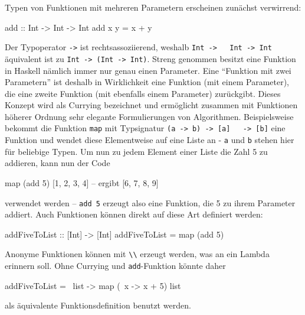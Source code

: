 \documentclass[12pt, a4paper, bibgerm]{scrbook}
\newenvironment{DIFnomarkup}{}{}
\newcommand\icode[1]{\lstinline?#1?}
\begin{document}
Typen von Funktionen mit mehreren Parametern erscheinen
zunächst verwirrend:
\begin{DIFnomarkup}\begin{code}
add :: Int -> Int -> Int
add x y = x + y  
\end{code}\end{DIFnomarkup}
Der Typoperator \icode{->} ist rechtsassoziierend, weshalb \icode{Int ->
  Int -> Int} äquivalent ist zu \icode{Int -> (Int -> Int)}. Streng
genommen besitzt eine Funktion in Haskell nämlich immer nur genau einen
Parameter. Eine "`Funktion mit zwei Parametern"' ist deshalb in
Wirklichkeit eine Funktion (mit einem Parameter), die eine zweite
Funktion (mit ebenfalls einem Parameter) zurückgibt. Dieses Konzept wird
als Currying bezeichnet und ermöglicht zusammen mit Funktionen höherer
Ordnung sehr elegante Formulierungen von Algorithmen. Beispielsweise
bekommt die Funktion \icode{map} mit Typsignatur \icode{(a -> b) -> [a]
  -> [b]} eine Funktion und wendet diese Elementweise auf eine Liste an
- \icode{a} und \icode{b} stehen hier für beliebige Typen. Um nun zu
jedem Element einer Liste die Zahl 5 zu addieren, kann nun der Code
\begin{DIFnomarkup}\begin{code}
map (add 5) [1, 2, 3, 4]  -- ergibt [6, 7, 8, 9]
\end{code}\end{DIFnomarkup}
verwendet werden -- \icode{add 5} erzeugt also eine Funktion, die 5 zu
ihrem Parameter addiert. Auch Funktionen können direkt auf diese Art
definiert werden:
\begin{DIFnomarkup}\begin{code}
addFiveToList :: [Int] -> [Int]
addFiveToList = map (add 5)
\end{code}\end{DIFnomarkup}
Anonyme Funktionen können mit \icode{\\} erzeugt werden, was an ein
Lambda erinnern soll. Ohne Currying und \icode{add}-Funktion
könnte daher
\begin{code}
addFiveToList = \ list -> map (\ x -> x + 5) list
\end{code}
als äquivalente Funktionsdefinition benutzt werden.
\end{document}
